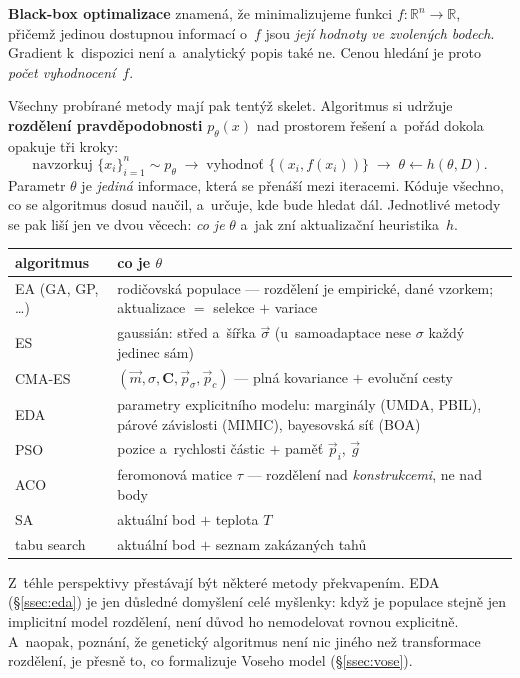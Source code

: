 \documentclass[11pt,a4paper]{article}
\theoremstyle{definition}
\begin{document}
\begin{defbox}
\textbf{Black-box optimalizace} znamená, že minimalizujeme funkci
$f : \mathbb{R}^n \to \mathbb{R}$, přičemž jedinou dostupnou informací o~$f$ jsou \emph{její
hodnoty ve zvolených bodech}. Gradient k~dispozici není a~analytický popis také ne. Cenou
hledání je proto \emph{počet vyhodnocení}~$f$.

Všechny probírané metody mají pak tentýž skelet. Algoritmus si udržuje \textbf{rozdělení
pravděpodobnosti} $p_\theta(x)$ nad prostorem řešení a~pořád dokola opakuje tři kroky:
\[
\text{navzorkuj } \{x_i\}_{i=1}^n \sim p_\theta
\;\longrightarrow\;
\text{vyhodnoť } \{(x_i, f(x_i))\}
\;\longrightarrow\;
\theta \leftarrow h(\theta, D).
\]
Parametr $\theta$ je \emph{jediná} informace, která se přenáší mezi iteracemi. Kóduje všechno,
co se algoritmus dosud naučil, a~určuje, kde bude hledat dál. Jednotlivé metody se pak liší jen
ve dvou věcech: \emph{co je} $\theta$ a~jak zní aktualizační heuristika~$h$.
\end{defbox}

\begin{center}
\small
\begin{tabular}{@{}p{3.2cm}p{11.6cm}@{}}
\toprule
\textbf{algoritmus} & \textbf{co je $\theta$} \\
\midrule
EA (GA, GP, \dots) & rodičovská populace --- rozdělení je empirické, dané vzorkem;
  aktualizace $=$ selekce $+$ variace \\
ES & gaussián: střed a~šířka $\vec\sigma$ (u~samoadaptace nese $\sigma$ každý jedinec sám) \\
CMA-ES & $(\vec m, \sigma, \mathbf{C}, \vec p_\sigma, \vec p_c)$ --- plná kovariance
  $+$ evoluční cesty \\
EDA & parametry explicitního modelu: marginály (UMDA, PBIL), párové závislosti (MIMIC),
  bayesovská síť (BOA) \\
PSO & pozice a~rychlosti částic $+$ paměť $\vec p_i$, $\vec g$ \\
ACO & feromonová matice $\tau$ --- rozdělení nad \emph{konstrukcemi}, ne nad body \\
SA & aktuální bod $+$ teplota $T$ \\
tabu search & aktuální bod $+$ seznam zakázaných tahů \\
\bottomrule
\end{tabular}
\end{center}

Z~téhle perspektivy přestávají být některé metody překvapením. EDA (\S\ref{ssec:eda}) je jen
důsledné domyšlení celé myšlenky: když je populace stejně jen implicitní model rozdělení, není
důvod ho nemodelovat rovnou explicitně. A~naopak, poznání, že genetický algoritmus není nic
jiného než transformace rozdělení, je přesně to, co formalizuje Voseho model
(\S\ref{ssec:vose}).
\end{document}
